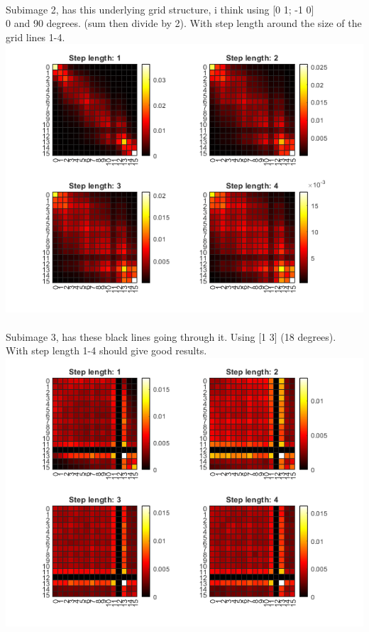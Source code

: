 \documentclass[12pt, letterpaper, twoside]{article}
\begin{document}
\newpage
\ \\
Subimage 2, has this underlying grid structure, i think using [0 1; -1 0]\\
0 and 90 degrees. (sum then divide by 2). With step length around the size of the grid lines 1-4.
\ \\
\includegraphics[scale=1]{"glcm2.png"}\\
\newpage
\ \\
Subimage 3, has these black lines going through it. Using [1 3] (18 degrees).\\
With step length 1-4 should give good results.
\ \\
\includegraphics[scale=1]{"glcm3.png"}\\
\end{document}
